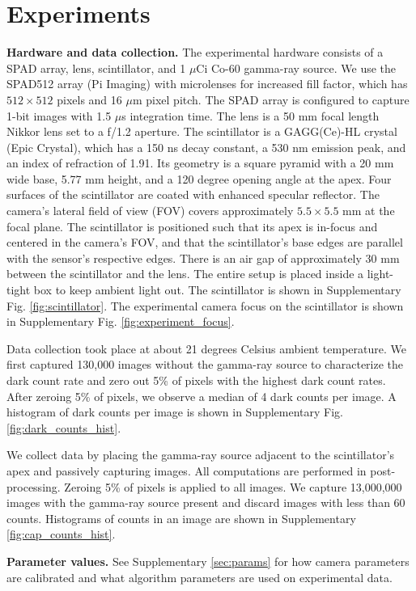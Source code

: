 \section{Experiments}
\textbf{Hardware and data collection.}
The experimental hardware consists of a SPAD array, lens, scintillator, and 1 $\mu$Ci Co-60 gamma-ray source.
We use the SPAD512 array (Pi Imaging) with microlenses for increased fill factor, 
which has $512 \times 512$ pixels and 16 $\mu$m pixel pitch.
The SPAD array is configured to capture 1-bit images with 1.5 $\mu$s 
integration time.
The lens is a 50 mm focal length Nikkor lens set to a f/1.2 aperture.
The scintillator is a GAGG(Ce)-HL crystal (Epic Crystal), which has a 150 ns decay 
constant, a 530 nm emission peak, and an index of refraction of 1.91.
Its geometry is a square pyramid with a 20 mm wide base, 5.77 mm 
height, and a 120 degree opening angle at the apex.
Four surfaces of the scintillator are coated with enhanced specular reflector.
The camera's lateral field of view (FOV) covers approximately $5.5 \times 5.5$ mm 
at the focal plane.
The scintillator is positioned such that its apex is in-focus and centered in the 
camera's FOV, and that the scintillator's base edges are parallel with the 
sensor's respective edges.
There is an air gap of approximately 30 mm between the scintillator and the lens.
The entire setup is placed inside a light-tight box to keep ambient light out.
The scintillator is shown in Supplementary Fig. \ref*{fig:scintillator}.
The experimental camera focus on the scintillator is shown in Supplementary Fig. \ref*{fig:experiment_focus}. 

Data collection took place at about 21 degrees Celsius ambient temperature.
We first captured 130,000 images without the gamma-ray source to characterize the 
dark count rate and zero out 5\% of pixels with the highest dark count rates.
After zeroing 5\% of pixels, we observe a median of 4 dark counts per image.
A histogram of dark counts per image is shown in Supplementary Fig. \ref*{fig:dark_counts_hist}.

We collect data by placing the gamma-ray source adjacent to the scintillator's 
apex and passively capturing images.
All computations are performed in post-processing.
Zeroing 5\% of pixels is applied to all images.
We capture 13,000,000 images with the gamma-ray source present and 
discard images with less than 60 counts.
Histograms of counts in an image are shown in Supplementary \cref*{fig:cap_counts_hist}.

\noindent
\textbf{Parameter values.}
See Supplementary \cref*{sec:params} for how camera parameters are calibrated and
what algorithm parameters are used on experimental data.


